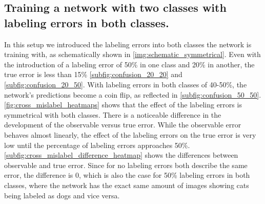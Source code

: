 \documentclass[a4paper,11pt]{scrartcl}
\theoremstyle{definition}
\begin{document}
\subsection[Two labels, labeling errors in both classes]{Training a network with two classes with labeling errors in both classes.}
In this setup we introduced the labeling errors into both classes the network is training with, as schematically shown in \autoref{img:schematic_symmetrical}.
Even with the introduction of a labeling error of 50\% in one class and 20\% in another, the true error is less than 15\% \autoref{subfig:confusion_20_20} and \ref{subfig:confusion_20_50}.
With labeling errors in both classes of 40-50\%, the network's predictions become a coin flip, as reflected in \autoref{subfig:confusion_50_50}.
\autoref{fig:cross_mislabel_heatmaps} shows that the effect of the labeling errors is symmetrical with both classes.
There is a noticeable difference in the development of the observable versus true error.
While the observable error behaves almost linearly, the effect of the labeling errors on the true error is very low until the percentage of labeling errors approaches 50\%.
\autoref{subfig:cross_mislabel_difference_heatmap} shows the differences between observable and true error.
Since for no labeling errors both describe the same error, the difference is 0, which is also the case for 50\% labeling errors in both classes, where the network has the exact same amount of images showing cats being labeled as dogs and vice versa.
\end{document}
